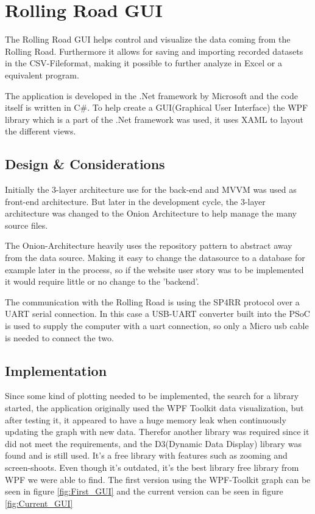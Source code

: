 \section{Rolling Road GUI}

The Rolling Road GUI helps control and visualize the data coming from the Rolling Road. Furthermore it allows for saving and importing recorded datasets in the CSV-Fileformat, making it possible to further analyze in Excel or a equivalent program.

The application is developed in the .Net framework by Microsoft and the code itself is written in C\#.
To help create a GUI(Graphical User Interface) the WPF library which is a part of the .Net framework was used, it uses XAML to layout the different views.

\subsection{Design \& Considerations}
Initially the 3-layer architecture use for the back-end and MVVM was used as front-end architecture. But later in the development cycle, the 3-layer architecture was changed to the Onion Architecture to help manage the many source files.


The Onion-Architecture heavily uses the repository pattern to abstract away from the data source. Making it easy to change the datasource to a database for example later in the process, so if the website user story was to be implemented it would require little or no change to the 'backend'.

The communication with the Rolling Road is using the SP4RR protocol over a UART serial connection. In this case a USB-UART converter built into the PSoC is used to supply the computer with a uart connection, so only a Micro usb cable is needed to connect the two.

\subsection{Implementation}
Since some kind of plotting needed to be implemented, the search for a library started, the application originally used the WPF Toolkit data visualization\cite{WPf_Toolkit}, but after testing it, it appeared to have a huge memory leak when continuously updating the graph with new data. Therefor another library was required since it did not meet the requirements, and the D3(Dynamic Data Display) library\cite{WPf_D3} was found and is still used. It's a free library with features such as zooming and screen-shoots. Even though it's outdated, it's the best library free library from WPF we were able to find. The first version using the WPF-Toolkit graph can be seen in figure \vref{fig:First_GUI} and the current version can be seen in figure \vref{fig:Current_GUI}

